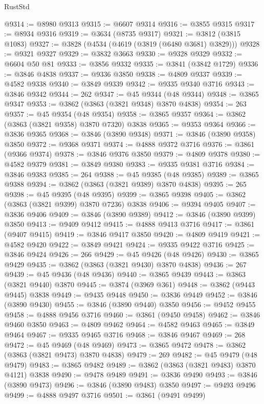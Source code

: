 \begin{lexlean}{RustStd}
\begin{coremodule}
@9314 := @8980 @9313
@9315 := @6607 @9314
@9316 := @3855 @9315
@9317 := @8934 @9316
@9319 := @3634 (@8735 @9317)
@9321 := @3812 (@3815 @1083)
@9327 := @3828 (@4534 (@4619 (@3819 (@6480 @3681) @3829)))
@9328 := @9321 @9327
@9329 := @3832 @3663
@9330 := @9328 @9329
@9332 := @6604 @50 @81
@9333 := @3856 @9332
@9335 := @3841 (@3842 @1729)
@9336 := @3846 @4838
@9337 := @9336 @3850
@9338 := @4809 @9337
@9339 := @4582 @9338
@9340 := @3849 @9339
@9342 := @9335 @9340 @3716
@9343 := @3846 @9342
@9344 := 262
@9347 := @45 @9344 (@48 @9344)
@9348 := @3865 @9347
@9353 := @3862 (@3863 (@3821 @9348) @3870 @4838)
@9354 := 263
@9357 := @45 @9354 (@48 @9354)
@9358 := @3865 @9357
@9364 := @3862 (@3863 (@3821 @9358) @3870 @7320) @3838
@9365 := @9353 @9364
@9366 := @3836 @9365
@9368 := @3846 (@3890 @9348)
@9371 := @3846 (@3890 @9358) @3850
@9372 := @9368 @9371
@9374 := @4888 @9372 @3716
@9376 := @3861 (@9366 @9374)
@9378 := @3846 @9376 @3850
@9379 := @4809 @9378
@9380 := @4582 @9379
@9381 := @3849 @9380
@9383 := @9335 @9381 @3716
@9384 := @3846 @9383
@9385 := 264
@9388 := @45 @9385 (@48 @9385)
@9389 := @3865 @9388
@9394 := @3862 (@3863 (@3821 @9389) @3870 @4838)
@9395 := 265
@9398 := @45 @9395 (@48 @9395)
@9399 := @3865 @9398
@9405 := @3862 (@3863 (@3821 @9399) @3870 @7236) @3838
@9406 := @9394 @9405
@9407 := @3836 @9406
@9409 := @3846 (@3890 @9389)
@9412 := @3846 (@3890 @9399) @3850
@9413 := @9409 @9412
@9415 := @4888 @9413 @3716
@9417 := @3861 (@9407 @9415)
@9419 := @3846 @9417 @3850
@9420 := @4809 @9419
@9421 := @4582 @9420
@9422 := @3849 @9421
@9424 := @9335 @9422 @3716
@9425 := @3846 @9424
@9426 := 266
@9429 := @45 @9426 (@48 @9426)
@9430 := @3865 @9429
@9435 := @3862 (@3863 (@3821 @9430) @3870 @4838)
@9436 := 267
@9439 := @45 @9436 (@48 @9436)
@9440 := @3865 @9439
@9443 := @3863 (@3821 @9440) @3870
@9445 := @3874 (@3969 @361)
@9448 := @3862 (@9443 @9445) @3838
@9449 := @9435 @9448
@9450 := @3836 @9449
@9452 := @3846 (@3890 @9430)
@9455 := @3846 (@3890 @9440) @3850
@9456 := @9452 @9455
@9458 := @4888 @9456 @3716
@9460 := @3861 (@9450 @9458)
@9462 := @3846 @9460 @3850
@9463 := @4809 @9462
@9464 := @4582 @9463
@9465 := @3849 @9464
@9467 := @9335 @9465 @3716
@9468 := @3846 @9467
@9469 := 268
@9472 := @45 @9469 (@48 @9469)
@9473 := @3865 @9472
@9478 := @3862 (@3863 (@3821 @9473) @3870 @4838)
@9479 := 269
@9482 := @45 @9479 (@48 @9479)
@9483 := @3865 @9482
@9489 := @3862 (@3863 (@3821 @9483) @3870 @4121) @3838
@9490 := @9478 @9489
@9491 := @3836 @9490
@9493 := @3846 (@3890 @9473)
@9496 := @3846 (@3890 @9483) @3850
@9497 := @9493 @9496
@9499 := @4888 @9497 @3716
@9501 := @3861 (@9491 @9499)

\end{coremodule}
\end{lexlean}

